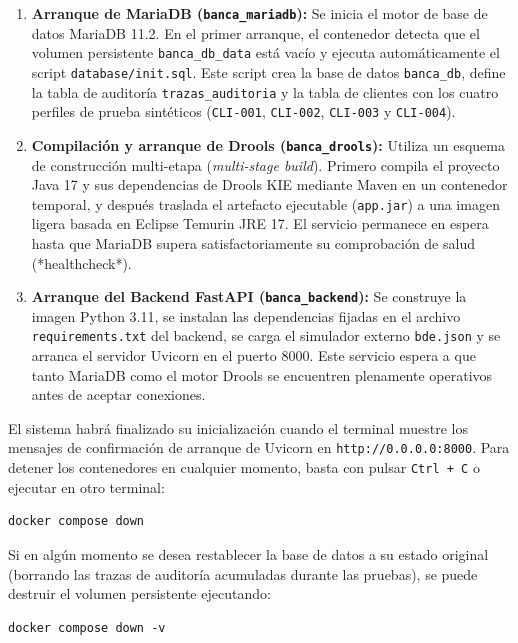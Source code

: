 \begin{enumerate}
    \item \textbf{Arranque de MariaDB (\texttt{banca\_mariadb}):} Se inicia el motor de base de datos MariaDB 11.2. En el primer arranque, el contenedor detecta que el volumen persistente \texttt{banca\_db\_data} está vacío y ejecuta automáticamente el script \texttt{database/init.sql}. Este script crea la base de datos \texttt{banca\_db}, define la tabla de auditoría \texttt{trazas\_auditoria} y la tabla de clientes con los cuatro perfiles de prueba sintéticos (\texttt{CLI-001}, \texttt{CLI-002}, \texttt{CLI-003} y \texttt{CLI-004}).
    
    \item \textbf{Compilación y arranque de Drools (\texttt{banca\_drools}):} Utiliza un esquema de construcción multi-etapa (\textit{multi-stage build}). Primero compila el proyecto Java 17 y sus dependencias de Drools KIE mediante Maven en un contenedor temporal, y después traslada el artefacto ejecutable (\texttt{app.jar}) a una imagen ligera basada en Eclipse Temurin JRE 17. El servicio permanece en espera hasta que MariaDB supera satisfactoriamente su comprobación de salud (*healthcheck*).
    
    \item \textbf{Arranque del Backend FastAPI (\texttt{banca\_backend}):} Se construye la imagen Python 3.11, se instalan las dependencias fijadas en el archivo \texttt{requirements.txt} del backend, se carga el simulador externo \texttt{bde.json} y se arranca el servidor Uvicorn en el puerto 8000. Este servicio espera a que tanto MariaDB como el motor Drools se encuentren plenamente operativos antes de aceptar conexiones.
\end{enumerate}

El sistema habrá finalizado su inicialización cuando el terminal muestre los mensajes de confirmación de arranque de Uvicorn en \texttt{http://0.0.0.0:8000}. Para detener los contenedores en cualquier momento, basta con pulsar \texttt{Ctrl + C} o ejecutar en otro terminal:

\begin{verbatim}
docker compose down
\end{verbatim}

Si en algún momento se desea restablecer la base de datos a su estado original (borrando las trazas de auditoría acumuladas durante las pruebas), se puede destruir el volumen persistente ejecutando:

\begin{verbatim}
docker compose down -v
\end{verbatim}

